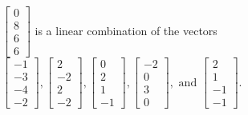 \begin{exercise}
\begin{exerciseStatement}
  \end{exerciseStatement}
  \begin{exerciseAnswer}
   \(\left[\begin{array}{c}
0 \\
8 \\
6 \\
6
\end{array}\right]\) 
  	 is  
	a linear combination of the vectors \(\left[\begin{array}{c}
-1 \\
-3 \\
-4 \\
-2
\end{array}\right] , \left[\begin{array}{c}
2 \\
-2 \\
2 \\
-2
\end{array}\right] , \left[\begin{array}{c}
0 \\
2 \\
1 \\
-1
\end{array}\right] , \left[\begin{array}{c}
-2 \\
0 \\
3 \\
0
\end{array}\right] , \text{ and } \left[\begin{array}{c}
2 \\
1 \\
-1 \\
-1
\end{array}\right]\).

	
  


  \end{exerciseAnswer}
\end{exercise}